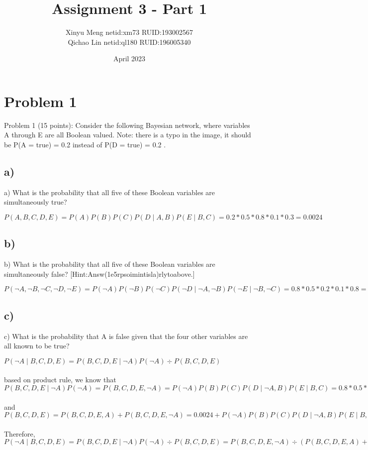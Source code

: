 \documentclass{article}
\title{Assignment 3 - Part 1}
\author{Xinyu Meng netid:xm73 RUID:193002567 
\\Qichao Lin netid:ql180 RUID:196005340}
\date{April 2023}
\begin{document}
\maketitle

\section{Problem 1}

Problem 1 (15 points): Consider the following Bayesian network, where variables A through E are all Boolean valued. Note: there is a typo in the image, it should be P(A = true) = 0.2 instead of P(D = true) = 0.2 .

\subsection{a)}
a) What is the probability that all five of these Boolean variables are simultaneously true?

$P(A,B,C,D,E) = P(A)P(B)P(C)P(D\mid A,B)P(E\mid B,C) = 0.2*0.5*0.8*0.1*0.3 = 0.0024$

\subsection{b)}
b) What is the probability that all five of these Boolean variables are simultaneously false? [Hint:Answ(1e5rpsoimintisla)rlytoabove.]

$P(\neg A,\neg B,\neg C,\neg D,\neg E) = P(\neg A)P(\neg B)P(\neg C)P(\neg D\mid \neg A,\neg B)P(\neg E\mid \neg B,\neg C) = 0.8*0.5*0.2*0.1*0.8 = 0.0064$

\subsection{c)}
c) What is the probability that A is false given that the four other variables are all known to be true?

$P(\neg A \mid B, C, D, E) = P(B,C,D,E \mid \neg A)P(\neg A)\div P(B,C,D,E)$
\\
\\based on product rule, we know that $P(B,C,D,E \mid \neg A)P(\neg A) = P(B,C,D,E, \neg A) = P(\neg A)P(B)P(C)P(D\mid \neg A,B)P(E\mid B,C) = 0.8*0.5*0.8*0.6*0.3 = 0.0576$
\\
\\and $P(B,C,D,E) = P(B,C,D,E,A) + P(B,C,D,E,\neg A) = 0.0024 + P(\neg A)P(B)P(C)P(D\mid \neg A,B)P(E\mid B,C) = 0.0024 + 0.8*0.5*0.8*0.6*0.3 = 0.06$
\\
\\Therefore, 
$P(\neg A \mid B, C, D, E) = P(B,C,D,E \mid \neg A)P(\neg A)\div P(B,C,D,E)= 
P(B,C,D,E, \neg A) \div (P(B,C,D,E,A) + P(B,C,D,E,\neg A)) = 0.0576 \div 0.06 = 0.96$
\end{document}
